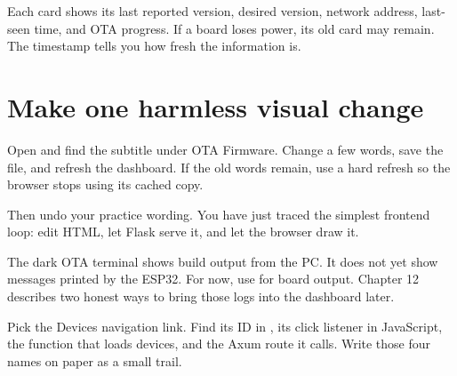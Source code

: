 Each card shows its last reported version, desired version, network address, last-seen time, and OTA progress. If a board loses power, its old card may remain. The timestamp tells you how fresh the information is.

\section{Make one harmless visual change}

Open  and find the subtitle under OTA Firmware. Change a few words, save the file, and refresh the dashboard. If the old words remain, use a hard refresh so the browser stops using its cached copy.

Then undo your practice wording. You have just traced the simplest frontend loop: edit HTML, let Flask serve it, and let the browser draw it.

\begin{mentorbox}
The dark OTA terminal shows build output from the PC. It does not yet show messages printed by the ESP32. For now, use  for board output. Chapter 12 describes two honest ways to bring those logs into the dashboard later.
\end{mentorbox}

\begin{checkpoint}
Pick the Devices navigation link. Find its ID in , its click listener in JavaScript, the function that loads devices, and the Axum route it calls. Write those four names on paper as a small trail.
\end{checkpoint}

